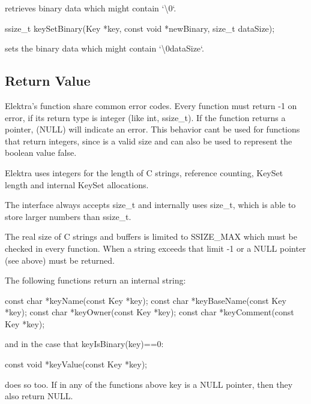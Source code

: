 retrieves binary data which might contain `\textquotesingle{}\textbackslash{}0\textquotesingle{}`. \begin{DoxyVerb}    ssize_t keySetBinary(Key *key, const void *newBinary, size_t dataSize);
\end{DoxyVerb}


sets the binary data which might contain `\textquotesingle{}\textbackslash{}0data\+Size`.

\subsection*{Return Value}

Elektra’s function share common error codes. Every function must return {\ttfamily -\/1} on error, if its return type is integer (like {\ttfamily int}, {\ttfamily ssize\+\_\+t}). If the function returns a pointer, {} ({\ttfamily N\+U\+LL}) will indicate an error. This behavior can\textquotesingle{}t be used for functions that return integers, since {} is a valid size and can also be used to represent the boolean value {\ttfamily false}.

Elektra uses integers for the length of C strings, reference counting, {\ttfamily Key\+Set} length and internal {\ttfamily Key\+Set} allocations.

The interface always accepts {\ttfamily size\+\_\+t} and internally uses {\ttfamily size\+\_\+t}, which is able to store larger numbers than {\ttfamily ssize\+\_\+t}.

The real size of C strings and buffers is limited to {\ttfamily S\+S\+I\+Z\+E\+\_\+\+M\+AX} which must be checked in every function. When a string exceeds that limit {\ttfamily -\/1} or a {\ttfamily N\+U\+LL} pointer (see above) must be returned.

The following functions return an internal string\+: \begin{DoxyVerb}    const char *keyName(const Key *key);
    const char *keyBaseName(const Key *key);
    const char *keyOwner(const Key *key);
    const char *keyComment(const Key *key);
\end{DoxyVerb}


and in the case that {\ttfamily key\+Is\+Binary(key)==0}\+: \begin{DoxyVerb}    const void *keyValue(const Key *key);
\end{DoxyVerb}


does so too. If in any of the functions above {\ttfamily key} is a {\ttfamily N\+U\+LL} pointer, then they also return {\ttfamily N\+U\+LL}.

